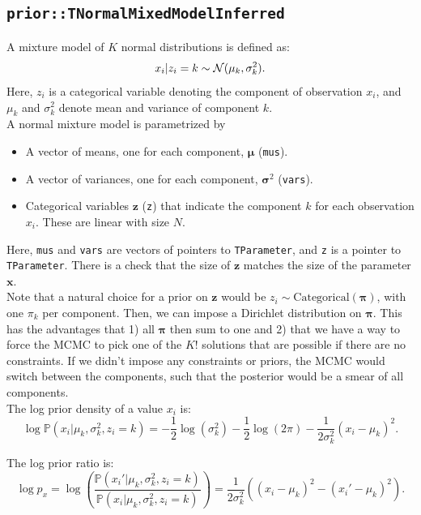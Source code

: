 \documentclass[a4paper,11pt]{article}
\def\x{\boldsymbol{x}}
\def\z{\boldsymbol{z}}
\def\bmu{\boldsymbol{\mu}}
\def\bpi{\boldsymbol{\pi}}
\def\bsigma{\boldsymbol{\sigma}}
\def\p{\mathbb{P}}
\newcommand{\class}[1]{\texttt{#1}}
\newcommand{\privparam}[1]{\texttt{\textunderscore #1}}
\begin{document}
\subsection{\class{prior::TNormalMixedModelInferred}}
A mixture model of $K$ normal distributions is defined as:
\begin{equation*}
x_i | z_i = k \sim {\cal N}(\mu_k, \sigma_k^2).
\end{equation*}
Here, $z_i$ is a categorical variable denoting the component of observation $x_i$, and $\mu_k$ and $\sigma_k^2$ denote mean and variance of component $k$. \\
A normal mixture model is parametrized by
\begin{itemize}
\item A vector of means, one for each component, $\bmu$ (\privparam{mus}).
\item A vector of variances, one for each component, $ \bsigma^2$ (\privparam{vars}).
\item Categorical variables $\z$ (\privparam{z}) that indicate the component $k$ for each observation $x_i$. These are linear with size $N$.
\end{itemize}
Here, \privparam{mus} and \privparam{vars} are vectors of pointers to \class{TParameter}, and \privparam{z} is a pointer to \class{TParameter}. There is a check that the size of $\z$ matches the size of the parameter $\x$.\\
Note that a natural choice for a prior on $\z$ would be $z_i \sim \text{Categorical}(\bpi)$, with one $\pi_k$ per component. Then, we can impose a Dirichlet distribution on $\bpi$. This has the advantages that 1) all $\bpi$ then sum to one and 2) that we have a way to force the MCMC to pick one of the $K!$ solutions that are possible if there are no constraints. If we didn't impose any constraints or priors, the MCMC would switch between the components, such that the posterior would be a smear of all components.\\
The log prior density of a value $x_i$ is:
\begin{equation}\label{eq:logPriorDensity_NormalMixedModel}
\log \p(x_i|\mu_k, \sigma_k^2, z_i = k) =
 -\frac{1}{2}\log(\sigma_k^2) - \frac{1}{2}\log(2\pi) - \frac{1}{2\sigma_k^2}(x_i - \mu_k)^2.
\end{equation}

The log prior ratio is:
\begin{equation*}
 \log p_x = \log \left( \frac{\p(x_i'|\mu_k, \sigma_k^2, z_i = k)}{\p(x_i|\mu_k, \sigma_k^2, z_i = k)} \right) =
 \frac{1}{2\sigma_k^2}\left((x_i - \mu_k)^2 - (x_i' - \mu_k)^2\right).
\end{equation*}
\end{document}
